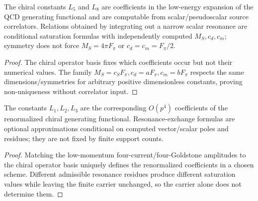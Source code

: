 \documentclass[12pt,a4paper]{article}
\begin{document}
\begin{theorem}
\label{p11:thm:native-scalar-L5-L8}

The chiral constants \(L_5\) and \(L_8\) are coefficients in the low-energy expansion of the QCD generating functional and are computable from scalar/pseudoscalar source correlators.  Relations obtained by integrating out a narrow scalar resonance are conditional saturation formulas with independently computed \(M_S,c_d,c_m\); symmetry does not force \(M_S=4\pi F_\pi\) or \(c_d=c_m=F_\pi/2\).
\label{p11:eq:native-scalar-contact-scale}
\label{p11:eq:native-L5-L8}
\label{p11:eq:native-2L8-minus-L5-zero}
\label{p11:eq:native-scalar-kl3-slopes}
\end{theorem}
\begin{proof}

The chiral operator basis fixes which coefficients occur but not their numerical values.  The family \(M_S=c_SF_\pi, c_d=aF_\pi,c_m=bF_\pi\) respects the same dimensions/symmetries for arbitrary positive dimensionless constants, proving non-uniqueness without correlator input.
\end{proof}

\begin{theorem}
\label{p11:thm:native-L1-L2-L3}

The constants \(L_1,L_2,L_3\) are the corresponding \(O(p^4)\) coefficients of the renormalized chiral generating functional.  Resonance-exchange formulas are optional approximations conditional on computed vector/scalar poles and residues; they are not fixed by finite support counts.
\label{p11:eq:native-L123-numeric}
\end{theorem}
\begin{proof}

Matching the low-momentum four-current/four-Goldstone amplitudes to the chiral operator basis uniquely defines the renormalized coefficients in a chosen scheme.  Different admissible resonance residues produce different saturation values while leaving the finite carrier unchanged, so the carrier alone does not determine them.
\end{proof}
\end{document}
